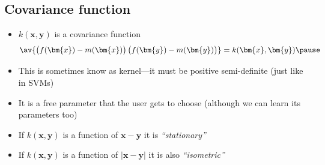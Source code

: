 
\begin{slide}
\section[-1]{Covariance function}

\begin{PauseHighLight}
  \begin{itemize}
  \item $k(\bm{x},\bm{y})$ is a covariance function
    \begin{align*}
      \av{\left(\strut f(\bm{x})-m(\bm{x})\right)
      \left(\strut f(\bm{y})-m(\bm{y})\right)} = k(\bm{x},\bm{y})\pause
    \end{align*}
  \item This is sometimes know as kernel\pause---it must be positive
    semi-definite\pause{} (just like in SVMs)\pauseb
  \item It is a free parameter that the user gets to choose (although we
    can learn its parameters too)\pause
  \item If $k(\bm{x},\bm{y})$ is a function of $\bm{x}-\bm{y}$ it is
    \emph{``stationary''}\pause
  \item If $k(\bm{x},\bm{y})$ is a function of $|\bm{x}-\bm{y}|$ it is
    also \emph{``isometric''}\pause
  \end{itemize}
\end{PauseHighLight}

\end{slide}


